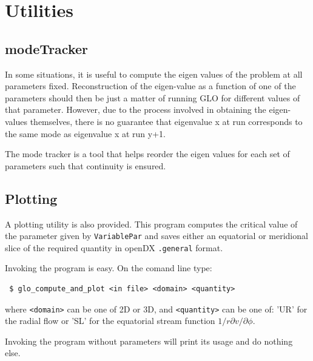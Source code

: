 \documentclass[a4paper,10pt]{book}
\begin{document}
\appendix

\chapter{Utilities}
\section{modeTracker}
\label{util:modeTracker}
In some situations, it is useful to compute the eigen values of the problem at
all parameters fixed. Reconstruction of the eigen-value as a function of one of
the parameters should then be just a matter of running GLO for different values
of that parameter. However, due to the process involved in obtaining the
eigen-values themselves, there is no guarantee that eigenvalue x at run
corresponds to the same mode as eigenvalue x at run y+1.

The mode tracker is a tool that helps reorder the eigen values for each set of
parameters such that continuity is ensured.

\section{Plotting}
A plotting utility is also provided. This program computes the critical value
of the parameter given by \verb|VariablePar| and saves either an equatorial 
or meridional slice of the required quantity in openDX \verb|.general| format.

Invoking the program is easy. On the comand line type:
\begin{verbatim}
 $ glo_compute_and_plot <in file> <domain> <quantity>
\end{verbatim}
where \verb|<domain>| can be one of 2D or 3D, and \verb|<quantity>| can be one 
of: 'UR' for the radial flow or 'SL' for the equatorial stream function
$1/r \partial v/\partial\phi$.

Invoking the program without parameters will print its usage and do nothing 
else.



\end{document}
